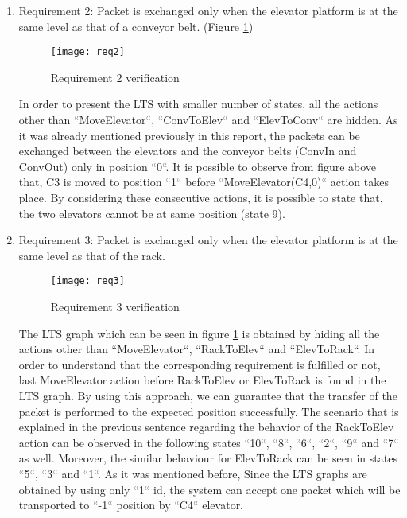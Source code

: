 \begin{enumerate}

\item
Requirement 2:  Packet is exchanged only when the elevator platform is at the same level as that of a conveyor belt. (Figure \ref{fig:req2})

\begin{figure}[h]
\center
\texttt{[image: req2]}
\caption{Requirement 2 verification}
\label{fig:req2}
\end{figure}

In order to present the LTS with smaller number of states, all the actions other than ``MoveElevator``, ``ConvToElev`` and ``ElevToConv`` are hidden. As it was already mentioned previously in this report, the packets can be exchanged between the elevators and the conveyor belts (ConvIn and ConvOut) only in position ``0``. It is possible to observe from figure above that, C3 is moved to position ``1`` before ``MoveElevator(C4,0)`` action takes place. By considering these consecutive actions, it is possible to state that, the two elevators cannot be at same position (state 9).


\item Requirement 3: Packet is exchanged only when the elevator platform is at the same level as that of the rack.

\begin{figure}[h]
\center
\texttt{[image: req3]}
\caption{Requirement 3 verification}
\label{fig:req3}
\end{figure}

The LTS graph which can be seen in figure \ref{fig:req2} is obtained by hiding all the actions other than ``MoveElevator``, ``RackToElev`` and ``ElevToRack``. In order to understand that the corresponding requirement is fulfilled or not, last MoveElevator action before RackToElev or ElevToRack is found  in the LTS graph. By using this approach, we can guarantee that the transfer of the packet is performed to the expected position successfully. The scenario that is explained in the previous sentence regarding the behavior of the RackToElev action can be observed in the following states ``10``, ``8``, ``6``, ``2``, ``9`` and ``7`` as well. Moreover, the similar behaviour for ElevToRack can be seen in states ``5``, ``3`` and ``1``. As it was mentioned before, Since the LTS graphs are obtained by using only ``1`` id, the system can accept one packet which will be transported to ``-1`` position by ``C4`` elevator.


\end{enumerate}

